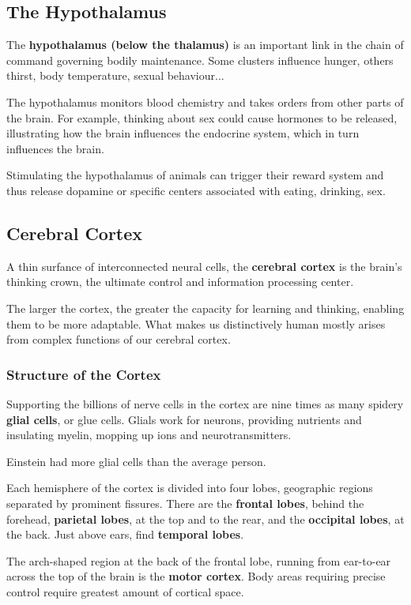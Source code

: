 \documentclass[12pt]{article}
\begin{document}
\subsection{The Hypothalamus}
The {\bf hypothalamus (below the thalamus)} is an important link in the chain of command governing bodily maintenance. Some clusters influence hunger, others thirst, body temperature, sexual behaviour...

The hypothalamus monitors blood chemistry and takes orders from other parts of the brain. For example, thinking about sex could cause hormones to be released, illustrating how the brain influences the endocrine system, which in turn influences the brain.

Stimulating the hypothalamus of animals can trigger their reward system and thus release dopamine or specific centers associated with eating, drinking, sex.

\subsection*{Cerebral Cortex}
A thin surfance of interconnected neural cells, the {\bf cerebral cortex} is the brain's thinking crown, the ultimate control and information processing center.

The larger the cortex, the greater the capacity for learning and thinking, enabling them to be more adaptable. What makes us distinctively human mostly arises from complex functions of our cerebral cortex.

\subsubsection*{Structure of the Cortex}
Supporting the billions of nerve cells in the cortex are nine times as many spidery \textbf{glial cells}, or glue cells. Glials work for neurons, providing nutrients and insulating myelin, mopping up ions and neurotransmitters.

Einstein had more glial cells than the average person.

Each hemisphere of the cortex is divided into four lobes, geographic regions separated by prominent fissures. There are the \textbf{frontal lobes}, behind the forehead, \textbf{parietal lobes}, at the top and to the rear, and the \textbf{occipital lobes}, at the back. Just above ears, find \textbf{temporal lobes}.

The arch-shaped region at the back of the frontal lobe, running from ear-to-ear across the top of the brain is the \textbf{motor cortex}. Body areas requiring precise control require greatest amount of cortical space.
\end{document}
